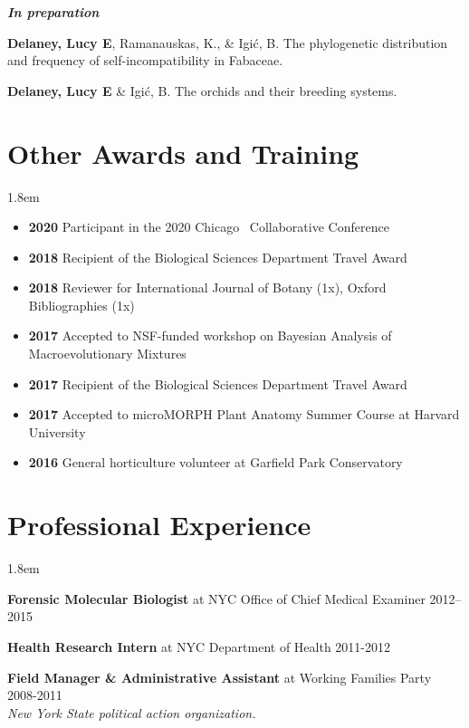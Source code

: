 \documentclass[]{article}
\newlength{\cslhangindent}
\newenvironment{cslreferences}
{\setlength{\parindent}{0pt}
\everypar{\setlength{\hangindent}{\cslhangindent}}\ignorespaces}
{\par}
\begin{document}
\textbf{\textit{In preparation}}
\vspace{2mm}

\begin{cslreferences}
\textbf{Delaney, Lucy E}, Ramanauskas, K., \& Igić, B. The phylogenetic distribution and frequency of self-incompatibility in Fabaceae.

\textbf{Delaney, Lucy E} \& Igić, B. The orchids and their breeding systems.\\
\end{cslreferences}
\vspace{2mm}

\section{Other Awards and Training}

\vspace{2mm}
\leftskip 1.8em

\begin{itemize}[label=$\mathwitch*$]
\item{\textbf{2020} Participant in the 2020 Chicago \textcolor{light-gray}{\faRProject}\ Collaborative Conference \href{https://chircollab.github.io/}{\faLink}}
\item{\textbf{2018} Recipient of the Biological Sciences Department Travel Award}
\item{\textbf{2018} Reviewer for International Journal of Botany (1x), Oxford Bibliographies (1x)}
\item{\textbf{2017} Accepted to NSF-funded workshop on Bayesian Analysis of Macroevolutionary Mixtures \href{http://bamm-project.org/index.html}{\faLink}}
\item{\textbf{2017} Recipient of the Biological Sciences Department Travel Award}
\item{\textbf{2017} Accepted to microMORPH Plant Anatomy Summer Course at Harvard University \href{https://web.archive.org/web/20170922060558/http://arboretum.harvard.edu/tracing-evolution-form-function/"}{\faLink}}
\item{\textbf{2016} General horticulture volunteer at Garfield Park Conservatory \href{https://garfieldconservatory.org/}{\faLink}}
\end{itemize}

\vspace{2mm}
\section{Professional Experience}

\vspace{2mm}
\leftskip 1.8em

\textbf{Forensic Molecular Biologist} at NYC Office of Chief Medical Examiner \hfill 2012--2015
   
\textbf{Health Research Intern} at NYC Department of Health \hfill 2011-2012
     
\textbf{Field Manager \& Administrative Assistant} at Working Families Party \hfill 2008-2011\\
\textit{New York State political action organization.}
\end{document}
